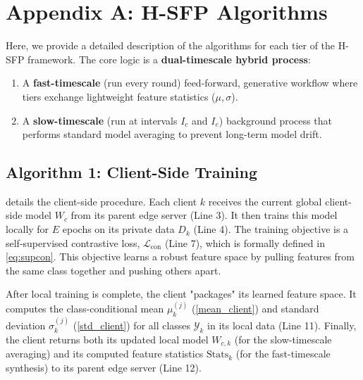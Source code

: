 \section*{Appendix A: H-SFP Algorithms}

Here, we provide a detailed description of the algorithms for each tier of the H-SFP framework. The core logic is a \textbf{dual-timescale hybrid process}:
\begin{enumerate}
    \item A \textbf{fast-timescale} (run every round) feed-forward, generative workflow where tiers exchange lightweight feature statistics ($\mu, \sigma$).
    \item A \textbf{slow-timescale} (run at intervals $I_c$ and $I_e$) background process that performs standard model averaging to prevent long-term model drift.
\end{enumerate}

\subsection*{Algorithm 1: Client-Side Training}

 details the client-side procedure. Each client $k$ receives the current global client-side model $W_c$ from its parent edge server (Line 3). It then trains this model locally for $E$ epochs on its private data $D_k$ (Line 4). The training objective is a self-supervised contrastive loss, $\mathcal{L}_{\text{con}}$ (Line 7), which is formally defined in \cref{eq:supcon}. This objective learns a robust feature space by pulling features from the same class together and pushing others apart.

After local training is complete, the client "packages" its learned feature space. It computes the class-conditional mean $\mu_k^{(j)}$ (\cref{mean_client}) and standard deviation $\sigma_k^{(j)}$ (\cref{std_client}) for all classes $\mathcal{Y}_k$ in its local data (Line 11). Finally, the client returns both its updated local model $W_{c,k}$ (for the slow-timescale averaging) and its computed feature statistics $\text{Stats}_k$ (for the fast-timescale synthesis) to its parent edge server (Line 12).

